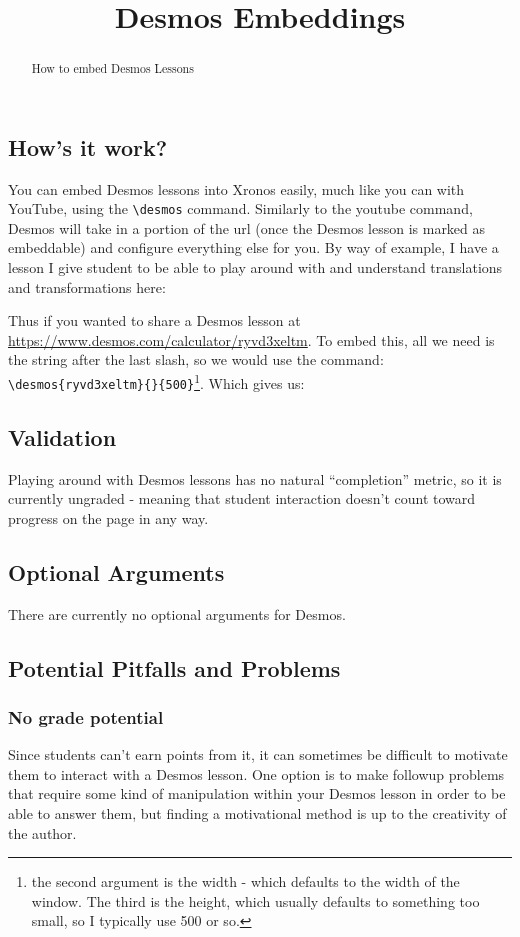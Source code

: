 \documentclass{ximera}
\title{Desmos Embeddings}
\begin{document}
\begin{abstract}
    How to embed Desmos Lessons
\end{abstract}
\maketitle

\subsection*{How's it work?}

    You can embed Desmos lessons into Xronos easily, much like you can with YouTube, using the \verb|\desmos| command. Similarly to the youtube command, Desmos will take in a portion of the url (once the Desmos lesson is marked as embeddable) and configure everything else for you. By way of example, I have a lesson I give student to be able to play around with and understand translations and transformations here: 
    
    Thus if you wanted to share a Desmos lesson at \url{https://www.desmos.com/calculator/ryvd3xeltm}. To embed this, all we need is the string after the last slash, so we would use the command: \\ \verb|\desmos{ryvd3xeltm}{}{500}|\footnote{the second argument is the width - which defaults to the width of the window. The third is the height, which usually defaults to something too small, so I typically use 500 or so.}. Which gives us:


\subsection*{Validation}
    Playing around with Desmos lessons has no natural ``completion'' metric, so it is currently ungraded - meaning that student interaction doesn't count toward progress on the page in any way.

    
\subsection*{Optional Arguments}
    There are currently no optional arguments for Desmos.

\subsection*{Potential Pitfalls and Problems}
    \subsubsection*{No grade potential}
        Since students can't earn points from it, it can sometimes be difficult to motivate them to interact with a Desmos lesson. One option is to make followup problems that require some kind of manipulation within your Desmos lesson in order to be able to answer them, but finding a motivational method is up to the creativity of the author.
    
\end{document}
